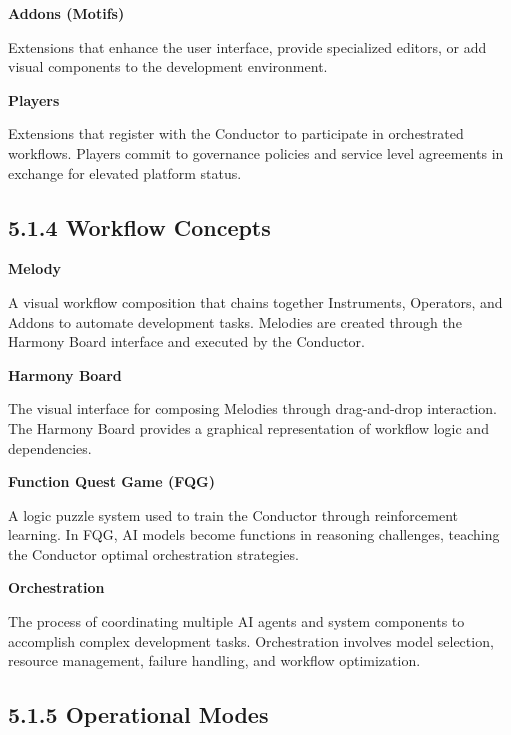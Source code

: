 \noindent\textbf{Addons (Motifs)}

Extensions that enhance the user interface, provide specialized editors, or add visual components to the development environment.

\vspace{0.3cm}

\noindent\textbf{Players}

Extensions that register with the Conductor to participate in orchestrated workflows. Players commit to governance policies and service level agreements in exchange for elevated platform status.

\subsection*{5.1.4 Workflow Concepts}

\vspace{0.3cm}

\noindent\textbf{Melody}

A visual workflow composition that chains together Instruments, Operators, and Addons to automate development tasks. Melodies are created through the Harmony Board interface and executed by the Conductor.

\vspace{0.3cm}

\noindent\textbf{Harmony Board}

The visual interface for composing Melodies through drag-and-drop interaction. The Harmony Board provides a graphical representation of workflow logic and dependencies.

\vspace{0.3cm}

\noindent\textbf{Function Quest Game (FQG)}

A logic puzzle system used to train the Conductor through reinforcement learning. In FQG, AI models become functions in reasoning challenges, teaching the Conductor optimal orchestration strategies.

\vspace{0.3cm}

\noindent\textbf{Orchestration}

The process of coordinating multiple AI agents and system components to accomplish complex development tasks. Orchestration involves model selection, resource management, failure handling, and workflow optimization.

\subsection*{5.1.5 Operational Modes}

